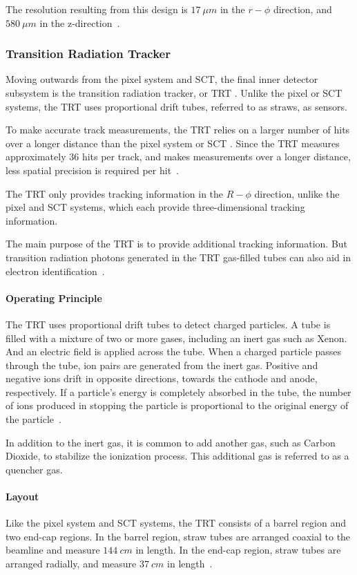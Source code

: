 The resolution resulting from this design is $17~\mu m$ in the $r-\phi$ direction, and $580~\mu m$ in the z-direction~\cite{sct-2010}.

\subsubsection{Transition Radiation Tracker}\label{subsubsec:trt}
Moving outwards from the pixel system and SCT, the final inner detector subsystem is the transition radiation tracker, or TRT .
Unlike the pixel or SCT systems, the TRT uses proportional drift tubes, referred to as straws, as sensors.

To make accurate track measurements, the TRT relies on a larger number of hits over a longer distance than the pixel system or SCT .
Since the TRT measures approximately 36 hits per track, and makes measurements over a longer distance,
less spatial precision is required per hit~\cite{atlas-detector-2008}.

The TRT only provides tracking information in the $R-\phi$ direction, unlike the pixel and SCT systems,
which each provide three-dimensional tracking information.

The main purpose of the TRT is to provide additional tracking information.
But transition radiation photons generated in the TRT gas-filled tubes can also aid in electron identification~\cite{atlas-detector-2008}.

\paragraph{Operating Principle}
The TRT uses proportional drift tubes to detect charged particles.
A tube is filled with a mixture of two or more gases, including an inert gas such as Xenon.
And an electric field is applied across the tube.
When a charged particle passes through the tube, ion pairs are generated from the inert gas.
Positive and negative ions drift in opposite directions, towards the cathode and anode, respectively.
If a particle's energy is completely absorbed in the tube, the number of ions produced in stopping the particle is
proportional to the original energy of the particle~\cite{knoll-2000}.

In addition to the inert gas, it is common to add another gas, such as Carbon Dioxide, to stabilize the ionization process.
This additional gas is referred to as a quencher gas.

\paragraph{Layout}
Like the pixel system and SCT systems, the TRT consists of a barrel region and two end-cap regions.
In the barrel region, straw tubes are arranged coaxial to the beamline and measure $144~cm$ in length.
In the end-cap region, straw tubes are arranged radially, and measure $37~cm$ in length~\cite{atlas-detector-2008}.

